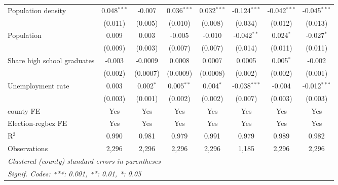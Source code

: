 \begin{table}[htbp]
\begin{tabular}{lccccccc}
      Population density                                      & 0.048$^{***}$        & -0.007                & 0.036$^{***}$         & 0.032$^{***}$  & -0.124$^{***}$ & -0.042$^{***}$ & -0.045$^{***}$\\   
                                                              & (0.011)              & (0.005)               & (0.010)               & (0.008)        & (0.034)        & (0.012)        & (0.013)\\   
      Population                                              & 0.009                & 0.003                 & -0.005                & -0.010         & -0.042$^{**}$  & 0.024$^{*}$    & -0.027$^{*}$\\   
                                                              & (0.009)              & (0.003)               & (0.007)               & (0.007)        & (0.014)        & (0.011)        & (0.011)\\   
      Share high school graduates                             & -0.003               & -0.0009               & 0.0008                & 0.0007         & 0.0005         & 0.005$^{*}$    & -0.002\\   
                                                              & (0.002)              & (0.0007)              & (0.0009)              & (0.0008)       & (0.002)        & (0.002)        & (0.001)\\   
      Unemployment rate                                       & 0.003                & 0.002$^{*}$           & 0.005$^{**}$          & 0.004$^{*}$    & -0.038$^{***}$ & -0.004         & -0.012$^{***}$\\   
                                                              & (0.003)              & (0.001)               & (0.002)               & (0.002)        & (0.007)        & (0.003)        & (0.003)\\   
      county FE                                               & Yes                  & Yes                   & Yes                   & Yes            & Yes            & Yes            & Yes\\  
      Election-regbez FE                                      & Yes                  & Yes                   & Yes                   & Yes            & Yes            & Yes            & Yes\\  
      R$^2$                                                   & 0.990                & 0.981                 & 0.979                 & 0.991          & 0.979          & 0.989          & 0.982\\  
      Observations                                            & 2,296                & 2,296                 & 2,296                 & 2,296          & 1,185          & 2,296          & 2,296\\  
      \midrule \midrule
      \multicolumn{8}{l}{\emph{Clustered (county) standard-errors in parentheses}}\\
      \multicolumn{8}{l}{\emph{Signif. Codes: ***: 0.001, **: 0.01, *: 0.05}}\\
   \end{tabular}
\end{table}


